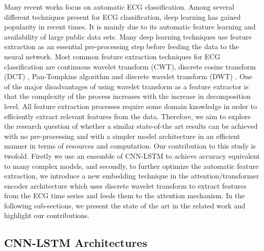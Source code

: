 \documentclass{ieeeaccess}
\begin{document}
Many recent works focus on automatic ECG classification. Among several different techniques present for ECG classification, deep learning has gained popularity in recent times. It is mainly due to its automatic feature learning and availability of large public data sets. Many deep learning techniques use feature extraction as an essential pre-processing step before feeding the data to the neural network. 
Most common feature extraction techniques for ECG classification are continuous wavelet transform (CWT), discrete cosine transform (DCT) \cite{article2}, Pan-Tompkins algorithm \cite{7019490} and discrete wavelet transform (DWT) {\cite{article}}. One of the major disadvantages of using wavelet transform as a feature extractor is that the complexity of the process increases with the increase in decomposition level. All feature extraction processes require some domain knowledge in order to efficiently extract relevant features from the data. Therefore, we aim to explore the research question of whether a similar state-of-the art results can be achieved with no pre-processing and with a simpler model architecture in an efficient manner in terms of resources and computation. 
Our contribution to this study is twofold. Firstly we use an ensemble of CNN-LSTM to achieve accuracy equivalent to many complex models, and secondly, to further optimize the automatic feature extraction, we introduce a new embedding technique in the attention/transformer encoder architecture which uses discrete wavelet transform to extract features from the ECG time series and feeds them to the attention mechanism. 
In the following sub-sections, we present the state of the art in the related work and highlight our contributions.

\subsection{CNN-LSTM Architectures}
\end{document}
